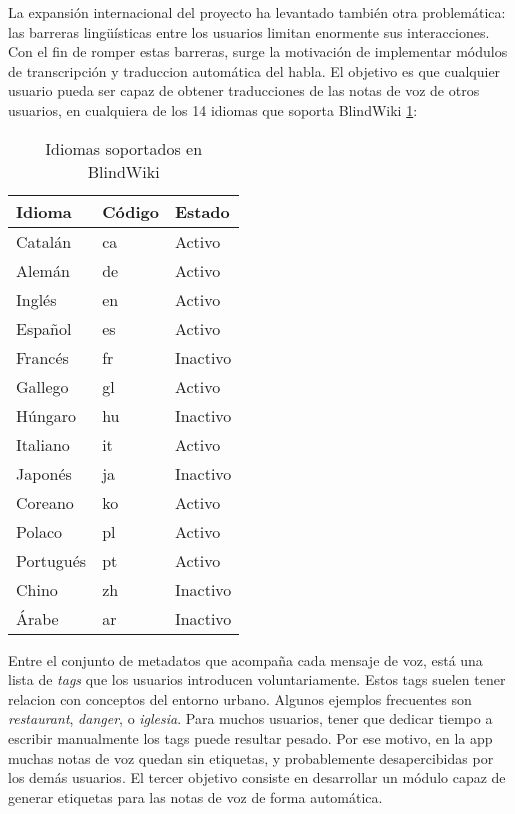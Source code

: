 La expansión internacional del proyecto ha levantado también otra problemática: las barreras lingüísticas entre los usuarios limitan enormente sus interacciones. Con el fin de romper estas barreras, surge la motivación de implementar módulos de transcripción y traduccion automática del habla. El objetivo es que cualquier usuario pueda ser capaz de obtener traducciones de las notas de voz de otros usuarios, en cualquiera de los 14 idiomas que soporta BlindWiki \ref{tab:supported-languages}:

\begin{table}[ht]
    \centering
    \caption{Idiomas soportados en BlindWiki}
    \label{tab:supported-languages}
    \begin{tabular}{|l|l|l|}
        \hline
        \textbf{Idioma} & \textbf{Código} & \textbf{Estado} \\
        \hline
        Catalán & ca & Activo \\
        Alemán & de & Activo \\
        Inglés & en & Activo \\
        Español & es & Activo \\
        Francés & fr & Inactivo \\
        Gallego & gl & Activo \\
        Húngaro & hu & Inactivo \\
        Italiano & it & Activo \\
        Japonés & ja & Inactivo \\
        Coreano & ko & Activo \\
        Polaco  & pl & Activo \\
        Portugués & pt & Activo \\
        Chino & zh & Inactivo \\
        Árabe & ar & Inactivo \\
        \hline
    \end{tabular}
\end{table}

Entre el conjunto de metadatos que acompaña cada mensaje de voz, está una lista de \textit{tags} que los usuarios introducen voluntariamente. Estos tags suelen tener relacion con conceptos del entorno urbano. Algunos ejemplos frecuentes son \textit{restaurant}, \textit{danger}, o \textit{iglesia}. Para muchos usuarios, tener que dedicar tiempo a escribir manualmente los tags puede resultar pesado. Por ese motivo, en la app muchas notas de voz quedan sin etiquetas, y probablemente desapercibidas por los demás usuarios.
El tercer objetivo consiste en desarrollar un módulo capaz de generar etiquetas para las notas de voz de forma automática. 

